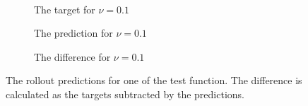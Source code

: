 \begin{figure}[H]
\begin{adjustwidth}{-0.1\linewidth}{-0.1\linewidth}
\begin{subfigure}{0.32\linewidth}
    \end{subfigure}
    \\[0.7\baselineskip]
    \begin{subfigure}{0.33\linewidth}
      \begin{adjustbox}{width=\linewidth}
        
      \end{adjustbox}
      \caption{The target for \(\nu=0.1\)}\label{fig:sc2_rollout_target_0.1}
    \end{subfigure}
    \begin{subfigure}{0.33\linewidth}
      \begin{adjustbox}{width=\linewidth}
        
      \end{adjustbox}
      \caption{The prediction for \(\nu=0.1\)}\label{fig:sc2_rollout_pred_0.1}
    \end{subfigure}
    \begin{subfigure}{0.32\linewidth}
      \begin{adjustbox}{width=\linewidth}
        
      \end{adjustbox}
      \caption{The difference for \(\nu=0.1\)}\label{fig:sc2_rollout_diff_0.1}
    \end{subfigure}
  \end{adjustwidth}
  \caption{The rollout predictions for one of the test function. The difference is calculated as the targets subtracted by the predictions.}\label{fig:scenario_2_rollout}
\end{figure}


